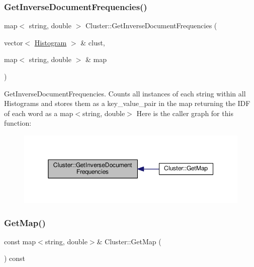 \subsubsection{\texorpdfstring{Get\+Inverse\+Document\+Frequencies()}{GetInverseDocumentFrequencies()}}
{\footnotesize\ttfamily map$<$ string, double $>$ Cluster\+::\+Get\+Inverse\+Document\+Frequencies (\begin{DoxyParamCaption}\item[{vector$<$ \hyperlink{class_histogram}{Histogram} $>$ \&}]{clust,  }\item[{map$<$ string, double $>$ \&}]{map }\end{DoxyParamCaption})}

Get\+Inverse\+Document\+Frequencies. Counts all instances of each string within all Histograms and stores them as a key\+\_\+value\+\_\+pair in the map returning the I\+DF of each word as a map$<$string, double$>$ Here is the caller graph for this function\+:
\nopagebreak
\begin{figure}[H]
\begin{center}
\leavevmode
\includegraphics[width=350pt]{class_cluster_ada4f897af1294c97e3ff2f8023a92b55_icgraph}
\end{center}
\end{figure}
\mbox{\label{class_cluster_a4e3685824bdd4b01763f8e811000f275}} 
\subsubsection{\texorpdfstring{Get\+Map()}{GetMap()}\hspace{0.1cm}{\footnotesize\ttfamily [1/2]}}
{\footnotesize\ttfamily const map$<$string, double$>$\& Cluster\+::\+Get\+Map (\begin{DoxyParamCaption}{ }\end{DoxyParamCaption}) const\hspace{0.3cm}{\ttfamily [inline]}}

